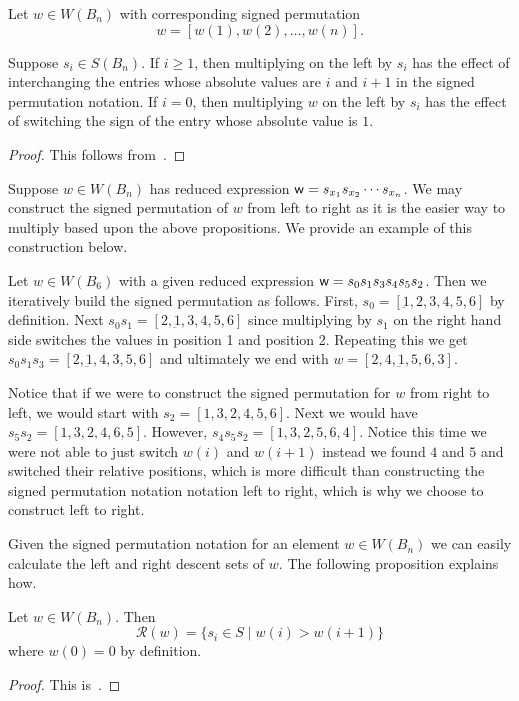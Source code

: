 \begin{proposition}
Let $w \in W(B_n)$ with corresponding signed permutation 
	\[w=[w(1),w(2), \ldots ,w(n)].\]
	
	Suppose $s_i \in S(B_n)$. If $i \geq 1$, then multiplying on the left by $s_i$ has the effect of interchanging the entries whose absolute values are $i$ and $i+1$ in the signed permutation notation. If $i=0$, then multiplying $w$ on the left by $s_i$ has the effect of switching the sign of the entry whose absolute value is $1$.
	\begin{proof}
	This follows from~\cite[Section 8.1 and A3.1]{Bjorner2005}.	
	\end{proof}
\end{proposition}

Suppose $w \in W(B_n)$ has reduced expression $\mathsf{w}=s_{x_1}s_{x_2}\cdots s_{x_n}$. We may construct the signed permutation of $w$ from left to right as it is the easier way to multiply based upon the above propositions. We provide an example of this construction below.

\begin{example}
Let $w \in W(B_6)$ with a given reduced expression $\mathsf{w}=s_0s_1s_3s_4s_5s_2$. Then we iteratively build the signed permutation as follows. First, $s_0=[\underbar{1},2,3,4,5,6]$ by definition. Next $s_0s_1=[2,\underbar{1},3,4,5,6]$ since multiplying by $s_1$ on the right hand side switches the values in position 1 and position 2. Repeating this we get $s_0s_1s_3=[2,\underbar{1},4,3,5,6]$ and ultimately we end with $w=[2,4,\underbar{1},5,6,3]$. 

Notice that if we were to construct the signed permutation for $w$ from right to left, we would start with $s_2=[1,3,2,4,5,6]$. Next we would have $s_5s_2=[1,3,2,4,6,5]$. However, $s_4s_5s_2=[1,3,2,5,6,4]$. Notice this time we were not able to just switch $w(i)$ and $w(i+1)$ instead we found $4$ and $5$ and switched their relative positions, which is more difficult than constructing the signed permutation notation notation left to right, which is why we choose to construct left to right.
\end{example}

Given the signed permutation notation for an element $w \in W(B_n)$ we can easily calculate the left and right descent sets of $w$. The following proposition explains how.

\begin{proposition}\label{prop:descent}
Let $w \in W(B_n)$. Then 
\[ \mathcal{R}(w)=\{s_i \in S \mid w(i) > w(i+1)\} \]
where $w(0)=0$ by definition.
\begin{proof}
	This is~\cite[Proposition 8.1.2]{Bjorner2005}.
\end{proof}
\end{proposition}

